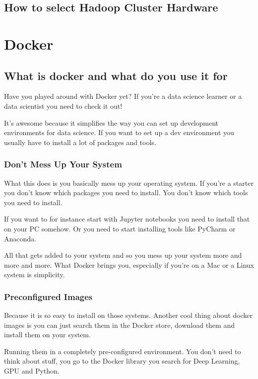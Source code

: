 \documentclass[12pt, numbers=noenddot]{scrreprt} %
\begin{document}
\section{How to select Hadoop Cluster Hardware}


\chapter{Docker}

\section{What is docker and what do you use it for}
Have you played around with Docker yet? If you’re a data science learner or a data scientist you need to check it out!

It’s awesome because it simplifies the way you can set up development environments for data science. If you want to set up a dev environment you usually have to install a lot of packages and tools.

\subsection{Don’t Mess Up Your System}

What this does is you basically mess up your operating system. If you’re a starter you don’t know which packages you need to install. You don’t know which tools you need to install.

If you want to for instance start with Jupyter notebooks you need to install that on your PC somehow. Or you need to start installing tools like PyCharm or Anaconda.

All that gets added to your system and so you mess up your system more and more and more. What Docker brings you, especially if you’re on a Mac or a Linux system is simplicity.

\subsection{Preconfigured Images}

Because it is so easy to install on those systems. Another cool thing about docker images is you can just search them in the Docker store, download them and install them on your system.

Running them in a completely pre-configured environment. You don’t need to think about stuff, you go to the Docker library you search for Deep Learning, GPU and Python.
\end{document}
